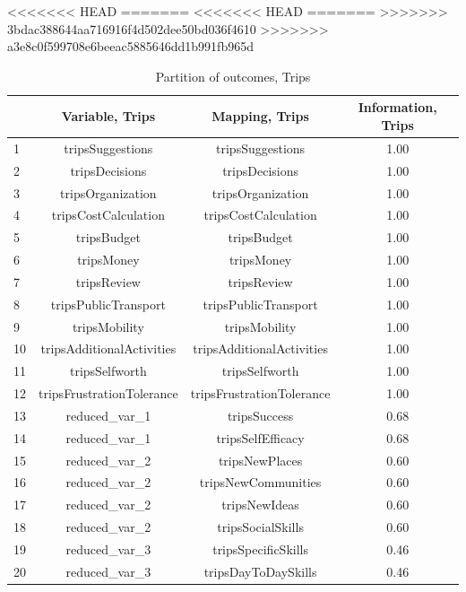 \documentclass[12pt, a4paper, titlepage]{article}\usepackage[]{graphicx}\usepackage[]{color}
\begin{document}
<<<<<<< HEAD
=======
<<<<<<< HEAD
=======
>>>>>>> 3bdac388644aa716916f4d502dee50bd036f4610
>>>>>>> a3e8c0f599708e6beeac5885646dd1b991fb965d
\begin{table}[ht]
\centering
\begin{tabular}{lccc}
  \hline
 & Variable, Trips & Mapping, Trips & Information, Trips \\ 
  \hline
1 & tripsSuggestions & tripsSuggestions & 1.00 \\ 
  2 & tripsDecisions & tripsDecisions & 1.00 \\ 
  3 & tripsOrganization & tripsOrganization & 1.00 \\ 
  4 & tripsCostCalculation & tripsCostCalculation & 1.00 \\ 
  5 & tripsBudget & tripsBudget & 1.00 \\ 
  6 & tripsMoney & tripsMoney & 1.00 \\ 
  7 & tripsReview & tripsReview & 1.00 \\ 
  8 & tripsPublicTransport & tripsPublicTransport & 1.00 \\ 
  9 & tripsMobility & tripsMobility & 1.00 \\ 
  10 & tripsAdditionalActivities & tripsAdditionalActivities & 1.00 \\ 
  11 & tripsSelfworth & tripsSelfworth & 1.00 \\ 
  12 & tripsFrustrationTolerance & tripsFrustrationTolerance & 1.00 \\ 
  13 & reduced\_var\_1 & tripsSuccess & 0.68 \\ 
  14 & reduced\_var\_1 & tripsSelfEfficacy & 0.68 \\ 
  15 & reduced\_var\_2 & tripsNewPlaces & 0.60 \\ 
  16 & reduced\_var\_2 & tripsNewCommunities & 0.60 \\ 
  17 & reduced\_var\_2 & tripsNewIdeas & 0.60 \\ 
  18 & reduced\_var\_2 & tripsSocialSkills & 0.60 \\ 
  19 & reduced\_var\_3 & tripsSpecificSkills & 0.46 \\ 
  20 & reduced\_var\_3 & tripsDayToDaySkills & 0.46 \\ 
   \hline
\end{tabular}
\caption{Partition of outcomes, Trips} 
\label{partitiontrips}
\end{table}
\end{document}
